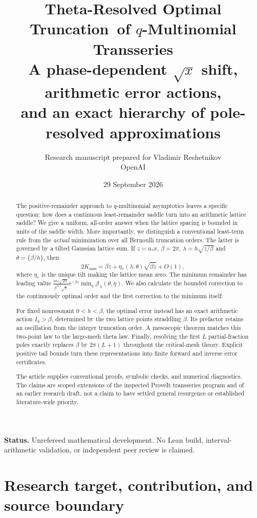 \documentclass[11pt,a4paper]{article}
\title{\textbf{Theta-Resolved Optimal Truncation\ of $q$-Multinomial Transseries}\\[7pt]
\large A phase-dependent $\sqrt{x}$ shift, arithmetic error actions,\\
and an exact hierarchy of pole-resolved approximations}
\author{Research manuscript prepared for Vladimir Reshetnikov\\\small OpenAI}
\date{29 September 2026}
\numberwithin{equation}{section}
\theoremstyle{definition}\newtheorem{definition}[theorem]{Definition}
\theoremstyle{remark}\newtheorem{remark}[theorem]{Remark}
\newcommand{\e}{\mathrm e}
\newcommand{\calJ}{\mathcal J}
\begin{document}
\maketitle
\begin{abstract}
The positive-remainder approach to $q$-multinomial asymptotics leaves a
specific question: how does a continuous least-remainder saddle turn into
an arithmetic lattice saddle? We give a uniform, all-order answer when the
lattice spacing is bounded in units of the saddle width. More importantly,
we distinguish a conventional least-term rule from the \emph{actual}
minimization over all Bernoulli truncation orders. The latter is governed
by a tilted Gaussian lattice sum. If $z=a_*x$, $\beta=2\pi$,
$\lambda=h\sqrt{z/\beta}$ and $\theta=\{\beta/h\}$, then
\[
  2K_{\min}=\beta z+\eta_*(\lambda,\theta)\sqrt{\beta z}+O(1),
\]
where $\eta_*$ is the unique tilt making the lattice mean zero. The minimum
remainder has leading value
$\frac{m_*\sqrt{2\pi}}{\beta^{3/2}\sqrt z}\e^{-\beta z}
\min_\eta\calJ_\lambda(\theta,\eta)$.
We also calculate the bounded correction to the continuously optimal order
and the first correction to the minimum itself.

For fixed nonresonant $0<h<\beta$, the optimal error instead has an exact
arithmetic action $I_h>\beta$, determined by the two lattice points
straddling $\beta$. Its prefactor retains an oscillation from the integer
truncation order. A mesoscopic theorem matches this two-point law to the
large-mesh theta law. Finally, resolving the first $L$ partial-fraction
poles exactly replaces $\beta$ by $2\pi(L+1)$ throughout the critical-mesh
theory. Explicit positive tail bounds turn these representations into
finite forward and inverse error certificates.

The article supplies conventional proofs, symbolic checks, and numerical
diagnostics. The claims are scoped extensions of the inspected ProveIt
transseries program and of an earlier research draft, not a claim to have
settled general resurgence or established literature-wide priority.
\end{abstract}
\medskip
\noindent\textbf{Status.} Unrefereed mathematical development. No Lean build,
interval-arithmetic validation, or independent peer review is claimed.
\clearpage
{\small\setlength{\parskip}{0pt}\tableofcontents}
\clearpage

\section{Research target, contribution, and source boundary}
\label{sec:scope}
\end{document}
